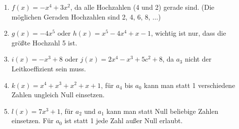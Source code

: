 \begin{Answer}[ref=ganzHauptA3]
	
	\begin{minipage}{\textwidth}
		\begin{enumerate}[label=\alph*)]
			\item \(f(x)=-x^4+3x^2\), da alle Hochzahlen (4 und 2) gerade sind. (Die möglichen Geraden Hochzahlen sind 2, 4, 6, 8, \(\dots\))
			\item \(g(x)=-4x^5\) oder \(h(x)=x^5-4x^4+x-1\), wichtig ist nur, dass die größte Hochzahl 5 ist.
			\item \(i(x)=-x^3+8\) oder \(j(x)=2x^4-x^3+5c^2+8\), da \(a_3\) nicht der Leitkoeffizient sein muss.
			\item \(k(x)=x^4+x^3+x^2+x+1\), für \(a_4\) bis \(a_0\) kann man statt 1 verschiedene Zahlen ungleich Null einsetzen. 
			\item \(l(x)=7x^3+1\), für \(a_2\) und \(a_1\) kann man statt Null beliebige Zahlen einsetzen. Für \(a_0\) ist statt 1 jede Zahl außer Null erlaubt. 
		\end{enumerate}
	\end{minipage}%
\end{Answer}